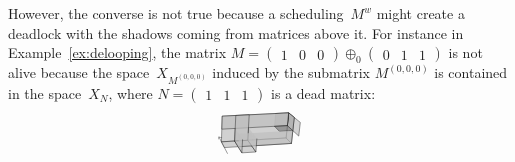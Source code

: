 \documentclass[orivec]{llncs} \usepackage[T1]{fontenc}
\newcommand{\glue}[1]{\oplus_{#1}}
\begin{document}
\noindent
However, the converse is not true because a scheduling~$M^w$ might create a
deadlock with the shadows coming from matrices above it. For instance in
Example~\ref{ex:delooping}, the matrix $M=(\begin{matrix}1&0&0\end{matrix})\glue
0(\begin{matrix}0&1&1\end{matrix})$ is not alive because the
space~$X_{M^{(0,0,0)}}$ induced by the submatrix $M^{(0,0,0)}$ is contained in
the space~$X_N$, where $N=(\begin{matrix}1&1&1\end{matrix})$ is a dead matrix:
\vspace{-1ex}
\[
\begin{tikzpicture}[line join=round,opacity=0.7]
\draw[arrows=->](.786,-.786)--(.561,-.354);
\filldraw[fill=lightgray](2.586,-.342)--(2.626,0)--(2.331,.24)--(2.298,-.08)--cycle;
\filldraw[fill=gray](2.436,-.206)--(2.473,.125)--(2.331,.24)--(2.298,-.08)--cycle;
\filldraw[fill=lightgray](2.401,-.527)--(2.473,.125)--(2.331,.24)--(2.266,-.391)--cycle;
\filldraw[fill=gray](1.973,-.098)--(2.298,-.08)--(2.331,.24)--(2.002,.224)--cycle;
\filldraw[fill=lightgray](.63,-.487)--(2.266,-.391)--(2.331,.24)--(.649,.158)--cycle;
\filldraw[fill=lightgray](.705,-.631)--(2.401,-.527)--(2.266,-.391)--(.63,-.487)--cycle;
\filldraw[fill=lightgray](.639,-.169)--(2.298,-.08)--(2.331,.24)--(.649,.158)--cycle;
\filldraw[fill=gray](2.1,-.225)--(2.436,-.206)--(2.298,-.08)--(1.973,-.098)--cycle;
\filldraw[fill=lightgray,draw=none](1.395,-.589)--(1.416,-.263)--(1.314,-.133)--(1.295,-.448)--cycle;
\draw(1.314,-.133)--(1.295,-.448)--(1.395,-.589);
\filldraw[fill=lightgray](.964,-.468)--(1.295,-.448)--(1.333,.192)--(.993,.175)--cycle;
\filldraw[fill=lightgray](1.147,-.763)--(1.503,-.741)--(1.295,-.448)--(.964,-.468)--cycle;
\filldraw[fill=lightgray,draw=none](1.052,-.61)--(1.068,-.283)--(.978,-.151)--(.964,-.468)--cycle;
\draw(.978,-.151)--(.964,-.468)--(1.052,-.61);
\filldraw[fill=lightgray,draw=none](1.416,-.263)--(1.395,-.589)--(2.401,-.527)--(2.436,-.206)--cycle;
\draw(1.395,-.589)--(2.401,-.527)--(2.436,-.206);
\filldraw[fill=lightgray,draw=none](1.395,-.589)--(1.503,-.741)--(1.526,-.404)--(1.416,-.263)--cycle;
\draw(1.395,-.589)--(1.503,-.741)--(1.526,-.404);
\filldraw[fill=lightgray,draw=none](1.416,-.263)--(1.068,-.283)--(1.052,-.61)--(1.395,-.589)--cycle;
\draw(1.052,-.61)--(1.395,-.589);
\filldraw[fill=lightgray,draw=none](1.052,-.61)--(1.147,-.763)--(1.165,-.425)--(1.068,-.283)--cycle;
\draw(1.052,-.61)--(1.147,-.763)--(1.165,-.425);

\end{tikzpicture}\]
\end{document}
